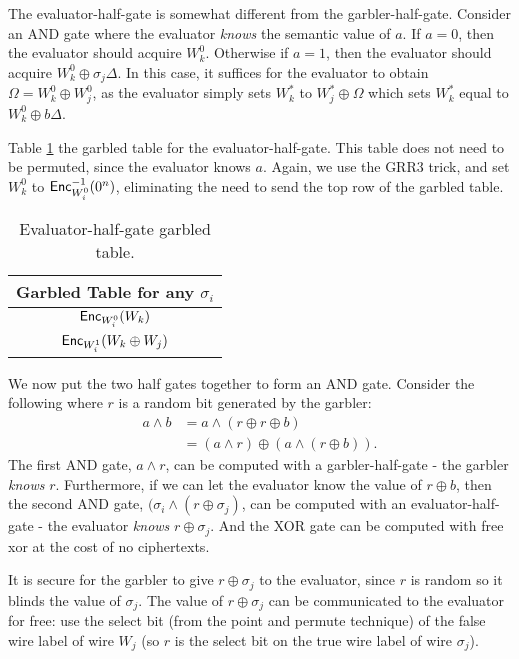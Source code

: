 The evaluator-half-gate is somewhat different from the garbler-half-gate.
Consider an AND gate where the evaluator \textit{knows} the semantic value of $a$.
If $a = 0$, then the evaluator should acquire $W_k^0$. 
Otherwise if $a = 1$, then the evaluator should acquire $W_k^0 \oplus \sigma_j\Delta$.
In this case, it suffices for the evaluator to obtain $\Omega = W_k^0 \oplus W_j^0$, as the evaluator simply sets $W_k^*$ to $W_j^* \oplus \Omega$ which sets $W_k^*$ equal to $W_k^0 \oplus b\Delta$.

Table \ref{tbl:halfgate-gg-eval} the garbled table for the evaluator-half-gate.
This table does not need to be permuted, since the evaluator knows $a$.
Again, we use the GRR3 trick, and set $W_k^0$ to $\textsf{Enc}^{-1}_{W_i^0}(0^n)$, eliminating the need to send the top row of the garbled table.

\begin{table}[h]
    \label{tbl:halfgate-gg-eval}
    \centering
    \begin{tabular}{|c|}
        \hline
        Garbled Table for any $\sigma_i$ \\
        \hline
        $\textsf{Enc}_{W_i^0}(W_k)$ \\
        $\textsf{Enc}_{W_i^1}(W_k \oplus W_j)$ \\
        \hline
    \end{tabular}
    \caption{Evaluator-half-gate garbled table.}
\end{table}

We now put the two half gates together to form an AND gate. 
Consider the following where $r$ is a random bit generated by the garbler:
\begin{align}
    a \wedge b & = a \wedge (r \oplus r \oplus b) \\
               & = (a \wedge r) \oplus (a \wedge (r \oplus b)).
\end{align}
The first AND gate, $a \wedge r$, can be computed with a garbler-half-gate - the garbler \textit{knows} $r$. 
Furthermore, if we can let the evaluator know the value of $r \oplus b$, then the second AND gate, $(\sigma_i \wedge (r \oplus \sigma_j)$, can be computed with an evaluator-half-gate - the evaluator \textit{knows} $r \oplus \sigma_j$. 
And the XOR gate can be computed with free xor at the cost of no ciphertexts. 

It is secure for the garbler to give $r \oplus \sigma_j$ to the evaluator, since $r$ is random so it blinds the value of $\sigma_j$. 
The value of $r \oplus \sigma_j$ can be communicated to the evaluator for free: use the select bit (from the point and permute technique) of the false wire label of wire $W_j$ (so $r$ is the select bit on the true wire label of wire $\sigma_j$).

